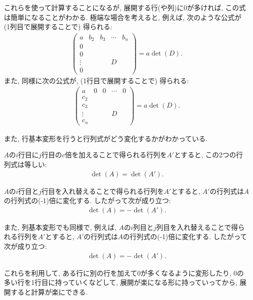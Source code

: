 これらを使って計算することになるが,
展開する行(や列)に0が多ければ,
この式は簡単になることがわかる.
極端な場合を考えると,
例えば, 次のような公式が (1列目で展開することで) 得られる:
\begin{align*}
  \left(
  \begin{array}{c|cccc}
a &b_2&b_3&\cdots&b_n\\\hline
0 &   &   &      &   \\
0 &   &   &      &   \\
\vdots &   &   &D&   \\
0 &   &   &      &   
  \end{array}
  \right)
  =a\det(D).
\end{align*}
また, 同様に次の公式が, (1行目で展開することで) 得られる:
\begin{align*}
  \left(
  \begin{array}{c|cccc}
a &0&0&\cdots&0\\\hline
c_2 &   &   &      &   \\
c_3 &   &   &      &   \\
\vdots &   &   &D&   \\
c_n &   &   &      &   
  \end{array}
  \right)
  =a\det(D).
\end{align*}

また, 行基本変形を行うと行列式がどう変化するかがわかっている.

$A$の$i$行目に$j$行目の$c$倍を加えることで得られる行列を$A'$とすると,
この2つの行列式は等しい:
\begin{align*}
  \det(A)=\det(A').
\end{align*}


$A$の$i$行目と$j$行目を入れ替えることで得られる行列を$A'$とすると,
$A'$の行列式は$A$の行列式の(-1)倍に変化する. したがって次が成り立つ:
\begin{align*}
  \det(A)=-\det(A').
\end{align*}

また,
列基本変形でも同様で, 例えば,
$A$の$i$列目と$j$列目を入れ替えることで得られる行列を$A'$とすると,
$A'$の行列式は$A$の行列式の(-1)倍に変化する. したがって次が成り立つ:
\begin{align*}
  \det(A)=-\det(A').
\end{align*}




これらを利用して,
ある行に別の行を加えて0が多くなるように変形したり,
0の多い行を1行目に持っていくなどして,
展開が楽になる形に持っていってから,
展開すると計算が楽にできる.

